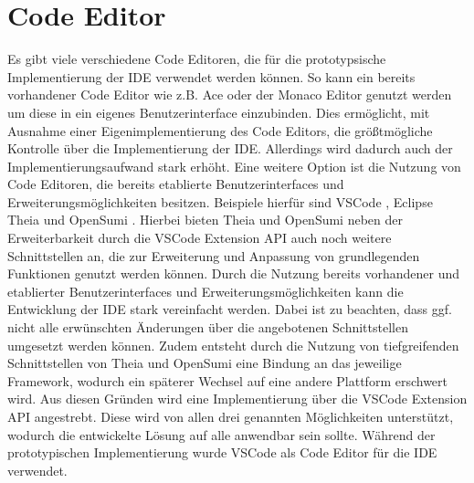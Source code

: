 \section{Code Editor}\label{section:prototypische-implementierung:code-editor}


Es gibt viele verschiedene Code Editoren, die für die prototypsische Implementierung der IDE verwendet werden können. So kann ein bereits vorhandener Code Editor wie z.B. Ace oder der Monaco Editor genutzt werden um diese in ein eigenes Benutzerinterface einzubinden. Dies ermöglicht, mit Ausnahme einer Eigenimplementierung des Code Editors, die größtmögliche Kontrolle über die Implementierung der IDE. Allerdings wird dadurch auch der Implementierungsaufwand stark erhöht. Eine weitere Option ist die Nutzung von Code Editoren, die bereits etablierte Benutzerinterfaces und Erweiterungsmöglichkeiten besitzen. Beispiele hierfür sind \ac{VSCode} \cite{noauthor_vscode_nodate}, Eclipse Theia \cite{noauthor_theia_nodate} und OpenSumi \cite{noauthor_opensumi_nodate}. Hierbei bieten Theia und OpenSumi neben der Erweiterbarkeit durch die VSCode Extension API \cite{noauthor_vscode-extension-api_nodate} auch noch weitere Schnittstellen an, die zur Erweiterung und Anpassung von grundlegenden Funktionen genutzt werden können. Durch die Nutzung bereits vorhandener und etablierter Benutzerinterfaces und Erweiterungsmöglichkeiten kann die Entwicklung der IDE stark vereinfacht werden. Dabei ist zu beachten, dass ggf. nicht alle erwünschten Änderungen über die angebotenen Schnittstellen umgesetzt werden können. Zudem entsteht durch die Nutzung von tiefgreifenden Schnittstellen von Theia und OpenSumi eine Bindung an das jeweilige Framework, wodurch ein späterer Wechsel auf eine andere Plattform erschwert wird. Aus diesen Gründen wird eine Implementierung über die VSCode Extension API angestrebt. Diese wird von allen drei genannten Möglichkeiten unterstützt, wodurch die entwickelte Lösung auf alle anwendbar sein sollte. Während der prototypischen Implementierung wurde \ac{VSCode} als Code Editor für die IDE verwendet.